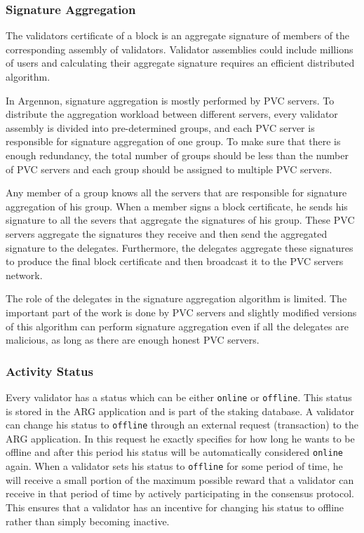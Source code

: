 \subsubsection{Signature Aggregation}\label{subsubsec:sig-agg}

The validators certificate of a block is an aggregate signature of members of the corresponding assembly of
validators. Validator assemblies could include millions of users and calculating their aggregate
signature requires an efficient distributed algorithm.

In Argennon, signature aggregation is mostly performed by PVC servers. To distribute the aggregation workload
between different servers, every validator assembly is divided into pre-determined groups, and each PVC
server is responsible for signature aggregation of one group. To make sure that there is enough redundancy, the
total number of groups should be less than the number of PVC servers and each group should be assigned to
multiple PVC servers.

Any member of a group knows all the servers that are responsible for signature aggregation of his group. When a member
signs a block certificate, he sends his signature to all the severs that aggregate the signatures of his group.
These PVC servers aggregate the signatures they receive and then send the aggregated signature to the delegates.
Furthermore, the delegates aggregate these signatures to produce the final block certificate
and then broadcast it to the PVC servers network.

The role of the delegates in the signature aggregation algorithm is limited. The important part of the work is done by
PVC servers and slightly modified versions of this algorithm can perform signature aggregation
even if all the delegates are malicious, as long as there are enough honest PVC servers.

\subsubsection{Activity Status}

Every validator has a status which can be either \texttt{online} or \texttt{offline}.
This status is stored in the ARG application and is part of the staking database. A validator can change
his status to \texttt{offline} through an external request (transaction) to the ARG application. In this request he
exactly specifies for how long he wants to be offline and after this period his status will be automatically considered
\texttt{online} again. When a validator sets his status to \texttt{offline} for some period of time, he
will receive a small portion of the maximum possible reward that a validator can receive in that period of time by
actively participating in the consensus protocol. This ensures that a validator has an incentive for changing his
status to offline rather than simply becoming inactive.

